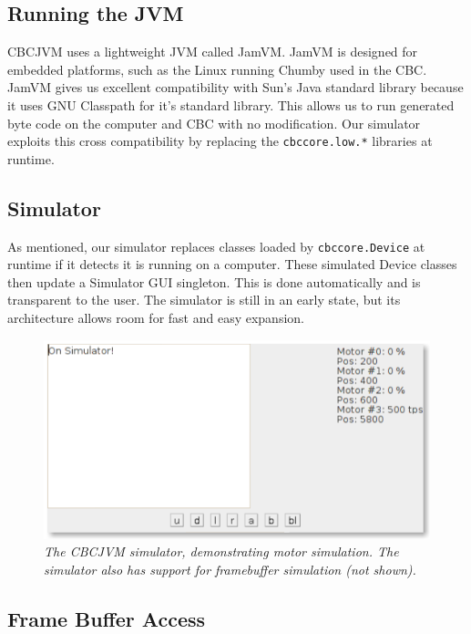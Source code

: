 \documentclass[12pt,letterpaper]{article}
\begin{document}
\subsection{Running the JVM}

CBCJVM uses a lightweight JVM called JamVM\cite{jamVM}. JamVM is designed for embedded platforms, such as the Linux running Chumby used in the CBC. JamVM gives us excellent compatibility with Sun's Java standard library because it uses GNU Classpath\cite{gnuClasspath} for it's standard library. This allows us to run generated byte code on the computer and CBC with no modification. Our simulator exploits this cross compatibility by replacing the \texttt{cbccore.low.*} libraries at runtime.



\subsection{Simulator}

As mentioned, our simulator replaces classes loaded by \texttt{cbccore.Device} at runtime if it detects it is running on a computer. These simulated Device classes then update a Simulator GUI singleton. This is done automatically and is transparent to the user. The simulator is still in an early state, but its architecture allows room for fast and easy expansion.

\begin{figure}[h]
\begin{flushright}
\includegraphics[width=.75\textwidth]{simulator.png}
\end{flushright}
\caption{\textit{The CBCJVM simulator, demonstrating motor simulation. The simulator also has support for framebuffer simulation (not shown).}}
\end{figure}


\subsection{Frame Buffer Access}
\end{document}
